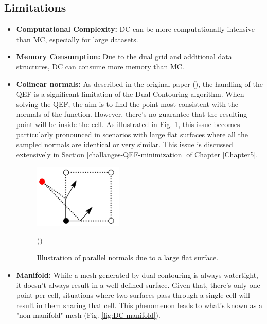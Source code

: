\subsection{Limitations}
\begin{itemize}
\item \textbf{Computational Complexity:} DC can be more computationally intensive than MC, especially for large datasets.

\item \textbf{Memory Consumption:} Due to the dual grid and additional data structures, DC can consume more memory than MC.

\item \textbf{Colinear normals:} 
As described in the original paper (\cite{Ju_2002}), the handling of the QEF is a significant limitation of the Dual Contouring algorithm. When solving the QEF, the aim is to find the point most consistent with the normals of the function. However, there's no guarantee that the resulting point will be inside the cell. As illustrated in Fig. \ref{fig:DC-colinear-ch3}, this issue becomes particularly pronounced in scenarios with large flat surfaces where all the sampled normals are identical or very similar. This issue is discussed extensively in Section \ref{challanges-QEF-minimization} of Chapter \ref{Chapter5}.

\begin{figure}
    \centering
    \includegraphics[width=0.4\textwidth]{Figures/DC-colinear.jpg}
    \decoRule
    \caption{Illustration of parallel normals due to a large flat surface.}(\cite{Boristhebrave_2018})
    \label{fig:DC-colinear-ch3}
\end{figure}

\item \textbf{Manifold:} 
While a mesh generated by dual contouring is always watertight, it doesn't always result in a well-defined surface. Given that, there's only one point per cell, situations where two surfaces pass through a single cell will result in them sharing that cell. This phenomenon leads to what's known as a "non-manifold" mesh (Fig. \ref{fig:DC-manifold}). 


\end{itemize}
